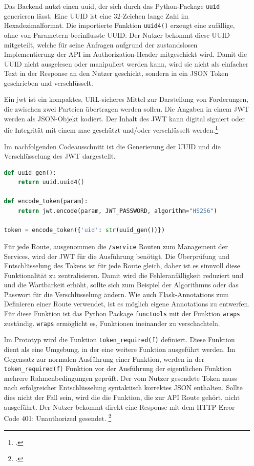 Das Backend nutzt einen \ac{uuid}, der sich durch das Python-Package \texttt{uuid} generieren lässt. Eine UUID ist eine 32-Zeichen lange Zahl im Hexadezimalformat. Die importierte Funktion \texttt{uuid4()} erzeugt eine zufällige, ohne von Parametern beeinflusste UUID. Der Nutzer bekommt diese UUID mitgeteilt, welche für seine Anfragen aufgrund der zustandslosen Implementierung der API im Authorization-Header mitgeschickt wird. Damit die UUID nicht ausgelesen oder manipuliert werden kann, wird sie nicht als einfacher Text in der Response an den Nutzer geschickt, sondern in ein JSON Token geschrieben und verschlüsselt.

Ein \ac{jwt} ist ein kompaktes, URL-sicheres Mittel zur Darstellung von Forderungen, die zwischen zwei Parteien übertragen werden sollen. Die Angaben in einem JWT werden als JSON-Objekt kodiert. Der Inhalt des JWT kann digital signiert oder die Integrität mit einem \ac{mac} geschützt und/oder verschlüsselt werden.\footcite{jones2015json}

Im nachfolgenden Codeausschnitt ist die Generierung der UUID und die Verschlüsselung des JWT dargestellt.
\begin{lstlisting}[language=Python, caption={Generierung der UUID und Erstellung des JWT}]
def uuid_gen():
    return uuid.uuid4()
    
def encode_token(param):
    return jwt.encode(param, JWT_PASSWORD, algorithm="HS256")

token = encode_token({'uid': str(uuid_gen())})
\end{lstlisting}

Für jede Route, ausgenommen die \texttt{/service} Routen zum Management der Services, wird der JWT für die Ausführung benötigt. Die Überprüfung und Entschlüsselung des Tokens ist für jede Route gleich, daher ist es sinnvoll diese Funktionalität zu zentralisieren. Damit wird die Fehleranfälligkeit reduziert und und die Wartbarkeit erhöht, sollte sich zum Beispiel der Algorithmus oder das Passwort für die Verschlüsselung ändern. Wie auch Flask-Annotations zum Definieren einer Route verwendet, ist es möglich eigene Annotations zu entwerfen. Für diese Funktion ist das Python Package \texttt{functools} mit der Funktion \texttt{wraps} zuständig. \texttt{wraps} ermöglicht es, Funktionen ineinander zu verschachteln.

Im Prototyp wird die Funktion \texttt{token\_{}required(f)} definiert. Diese Funktion dient als eine Umgebung, in der eine weitere Funktion ausgeführt werden. Im Gegensatz zur normalen Ausführung einer Funktion, werden in der \texttt{token\_{}required(f)} Funktion vor der Ausführung der eigentlichen Funktion mehrere Rahmenbedingungen geprüft. Der vom Nutzer gesendete Token muss nach erfolgreicher Entschlüsselung syntaktisch korrektes JSON enthalten. Sollte dies nicht der Fall sein, wird die die Funktion, die zur API Route gehört, nicht ausgeführt. Der Nutzer bekommt direkt eine Response mit dem HTTP-Error-Code 401: Unauthorized gesendet. \footcite{fielding1999rfc2616}

